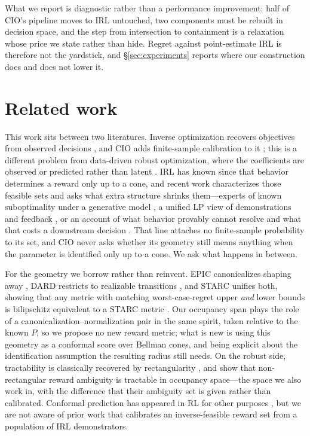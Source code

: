 \documentclass{article}
\begin{document}
What we report is diagnostic rather than a performance improvement: half of
CIO's pipeline moves to IRL untouched, two components must be rebuilt in
decision space, and the step from intersection to containment is a relaxation
whose price we state rather than hide. Regret
against point-estimate IRL is therefore not the yardstick, and
\S\ref{sec:experiments} reports where our construction does and does not lower
it.

\section{Related work}
\label{sec:related}

This work sits between two literatures. Inverse
optimization recovers objectives from observed decisions
\citep{ahuja2001inverse,chan2018inverse}, and CIO adds finite-sample
calibration to it \citep{lin2024conformal}; this is a different problem from
data-driven robust optimization, where the coefficients are observed or
predicted rather than latent
\citep{chenreddy2022datadriven,sun2023predictthencalibrate}. IRL has known
since \citet{ng2000algorithms} that behavior determines a reward only up to a
cone, and recent work characterizes those feasible sets and asks what extra
structure shrinks them---experts of known suboptimality under a generative
model \citep{poiani2024suboptimal}, a unified LP view of demonstrations and
feedback \citep{kim2024unified}, or an account of what behavior provably cannot
resolve \citep{skalse2023invariance} and what that costs a downstream decision
\citep{lazzati2025robustness,kim2026feasible}. That line
attaches no finite-sample probability to its set, and CIO never asks whether
its geometry still means anything when the parameter is identified only up to a
cone. We ask what happens in between.

For the geometry we borrow rather than reinvent. EPIC canonicalizes shaping away \citep{gleave2021epic}, DARD
restricts to realizable transitions \citep{wulfe2022dard}, and STARC unifies
both, showing that any metric with matching worst-case-regret upper \emph{and}
lower bounds is bilipschitz equivalent to a STARC metric
\citep{skalse2024starc}. Our occupancy span plays the role of a
canonicalization--normalization pair in the same spirit, taken relative to the
known $P$, so we propose no new reward metric; what is new is using
this geometry as a conformal score over Bellman cones, and being explicit about
the identification assumption the resulting radius still needs. On the robust
side, tractability is classically recovered by rectangularity
\citep{iyengar2005robust,nilim2005robust,wiesemann2013robust}, and
\citet{gadot2024solving} show that non-rectangular reward ambiguity is
tractable in occupancy space---the space we also work in, with the difference
that their ambiguity set is given rather than calibrated. Conformal prediction
has appeared in RL for other purposes \citep{gupta2023cammarl,
pan2026uncertaintyaware,zhou2025calibrating}, but we are not aware of prior
work that calibrates an inverse-feasible reward set from a population of IRL
demonstrators.
\end{document}
